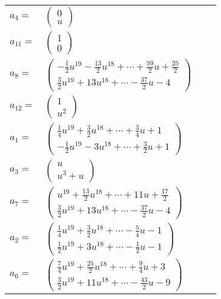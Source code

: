\documentclass[1p]{elsarticle_modified}
\theoremstyle{definition}
\begin{document}
\begin{tabular}{m{7pt} m{180pt} m{7pt} m{180pt} }
\flushright $a_{4}=$&$\begin{pmatrix}0\\u\end{pmatrix}$ \\
\flushright $a_{11}=$&$\begin{pmatrix}1\\0\end{pmatrix}$ \\
\flushright $a_{8}=$&$\begin{pmatrix}-\frac{1}{2} u^{19}-\frac{13}{2} u^{18}+\cdots+\frac{59}{2} u+\frac{25}{2}\\\frac{3}{2} u^{19}+13 u^{18}+\cdots-\frac{37}{2} u-4\end{pmatrix}$ \\
\flushright $a_{12}=$&$\begin{pmatrix}1\\u^2\end{pmatrix}$ \\
\flushright $a_{1}=$&$\begin{pmatrix}\frac{1}{4} u^{19}+\frac{3}{2} u^{18}+\cdots+\frac{3}{4} u+1\\-\frac{1}{2} u^{19}-3 u^{18}+\cdots+\frac{3}{2} u+1\end{pmatrix}$ \\
\flushright $a_{3}=$&$\begin{pmatrix}u\\u^3+u\end{pmatrix}$ \\
\flushright $a_{7}=$&$\begin{pmatrix}u^{19}+\frac{13}{2} u^{18}+\cdots+11 u+\frac{17}{2}\\\frac{3}{2} u^{19}+13 u^{18}+\cdots-\frac{37}{2} u-4\end{pmatrix}$ \\
\flushright $a_{2}=$&$\begin{pmatrix}\frac{1}{4} u^{19}+\frac{3}{2} u^{18}+\cdots-\frac{5}{4} u-1\\\frac{1}{2} u^{19}+3 u^{18}+\cdots-\frac{1}{2} u-1\end{pmatrix}$ \\
\flushright $a_{6}=$&$\begin{pmatrix}\frac{7}{4} u^{19}+\frac{25}{2} u^{18}+\cdots+\frac{9}{4} u+3\\\frac{3}{2} u^{19}+11 u^{18}+\cdots-\frac{43}{2} u-9\end{pmatrix}$ \\

\end{tabular}
\end{document}
